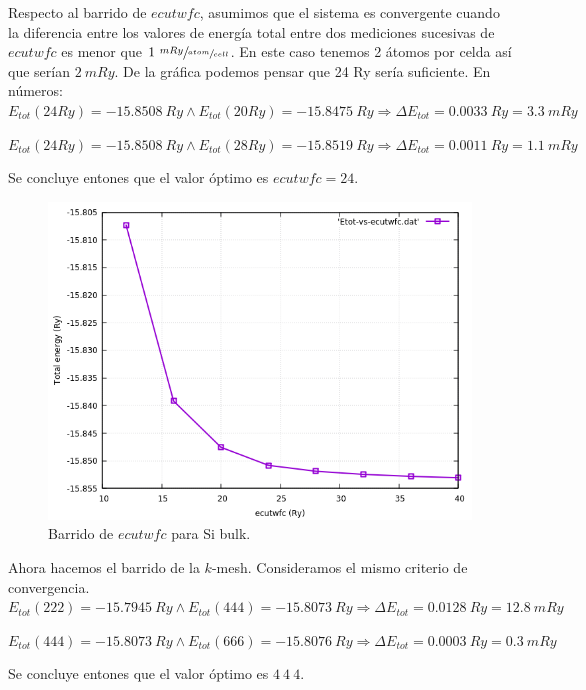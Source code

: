     Respecto al barrido de $ecutwfc$, asumimos que el sistema es convergente cuando la diferencia entre los valores de energía total entre dos mediciones sucesivas de $ecutwfc$ es menor que $1\ \sfrac{mRy}{\sfrac{atom}{cell}}$. En este caso tenemos 2 átomos por celda así que serían $2\ mRy$. De la gráfica podemos pensar que 24 Ry sería suficiente. En números:
      $E_{tot} (24 Ry) = -15.8508\ Ry \wedge E_{tot} (20 Ry) = -15.8475\ Ry \Rightarrow \Delta E_{tot} = 0.0033\ Ry = 3.3\ mRy$

      $E_{tot} (24 Ry) = -15.8508\ Ry \wedge E_{tot} (28 Ry) = -15.8519\ Ry \Rightarrow \Delta E_{tot} = 0.0011\ Ry = 1.1\ mRy$

    Se concluye entones que el valor óptimo es $ecutwfc = 24$.

      \begin{figure}[H]
          \centering
          \includegraphics[scale = 0.6]{figs/D2/Si_ecutwfc.png}
          \caption{Barrido de $ecutwfc$ para Si bulk.}
      \end{figure}

    Ahora hacemos el barrido de la $k$-mesh. Consideramos el mismo criterio de convergencia.
      $E_{tot} (222) = -15.7945\ Ry \wedge E_{tot} (444) = -15.8073\ Ry \Rightarrow \Delta E_{tot} = 0.0128\ Ry = 12.8\ mRy$

      $E_{tot} (444) = -15.8073\ Ry \wedge E_{tot} (666) = -15.8076\ Ry \Rightarrow \Delta E_{tot} = 0.0003\ Ry = 0.3\ mRy$

    Se concluye entones que el valor óptimo es $4\ 4\ 4$.

